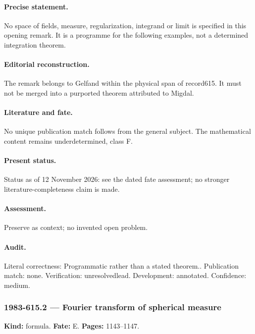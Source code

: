 \paragraph{Precise statement.} No space of fields, measure, regularization, integrand or limit is specified in this opening remark. It is a programme for the following examples, not a determined integration theorem.

\paragraph{Editorial reconstruction.} The remark belongs to Gelfand within the physical span of record615. It must not be merged into a purported theorem attributed to Migdal.

\paragraph{Literature and fate.} No unique publication match follows from the general subject. The mathematical content remains underdetermined, class F.

\paragraph{Present status.} Status as of 12 November 2026: see the dated fate assessment; no stronger literature-completeness claim is made.

\paragraph{Assessment.} Preserve as context; no invented open problem.

\paragraph{Audit.} Literal correctness: Programmatic rather than a stated theorem.. Publication match: none. Verification: unresolvedlead. Development: annotated. Confidence: medium.

\subsubsection{1983-615.2 --- Fourier transform of spherical measure}

\label{item:1983-615.2}

\noindent\textbf{Kind:} formula. \textbf{Fate:} E. \textbf{Pages:} 1143--1147.\par

